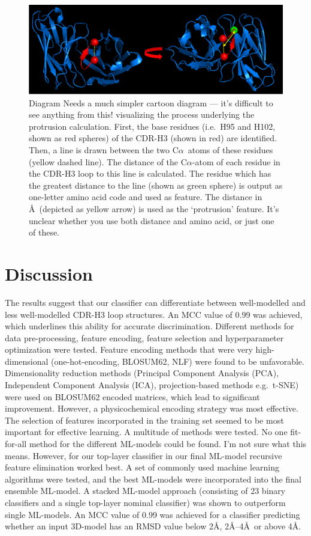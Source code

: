 \documentclass[12pt]{article}
\newcommand{\ca}{\mbox{C$\alpha$}}
\newcommand{\lilian}[1]{ {\color{red}{\bfseries Lilian:} #1}}
\begin{document}
\begin{figure}
  \centering
  \includegraphics[width=\linewidth]{angle.eps}
  \caption {Diagram \lilian{Needs a much simpler cartoon diagram --- it's difficult to see anything from this!}
    visualizing the process underlying the protrusion
    calculation. First, the base residues (i.e.\ H95 and H102, shown as
    red spheres) of the CDR-H3 (shown in red) are identified. Then, a
    line is drawn between the two \ca\ atoms of these residues (yellow
    dashed line). The distance of the \ca-atom of each residue in the
    CDR-H3 loop to this line is calculated. The residue which has the
    greatest distance to the line (shown as green sphere) is output
    as one-letter amino acid code and used as feature. The distance in
    \AA\ (depicted as yellow arrow) is used as the `protrusion'
    feature. \lilian{It's unclear whether you use both distance and amino acid, or just one of these.}}
  \label{fig:angle}
\end{figure}




\section{Discussion}
The results suggest that our classifier can differentiate
between well-modelled and less well-modelled CDR-H3 loop
structures. An MCC value of 0.99 was achieved, which underlines this
ability for accurate discrimination. Different methods for data
pre-processing, feature encoding, feature selection and hyperparameter
optimization were tested.
Feature encoding methods that were very high-dimensional
(one-hot-encoding, BLOSUM62, NLF) were found to be
unfavorable. Dimensionality reduction methods (Principal Component
Analysis (PCA), Independent Component Analysis (ICA), projection-based
methods e.g.\ t-SNE) were used on BLOSUM62 encoded matrices, which lead
to significant improvement. However, a physicochemical encoding
strategy was most effective.
The selection of features incorporated in the training set seemed to
be most important for effective learning. A multitude of methods were
tested. No one fit-for-all method for the different ML-models could be
found.\lilian{I'm not sure what this means.} However, for our top-layer classifier in our final ML-model
recursive feature elimination worked best.
A set of commonly used machine learning algorithms were tested, and
the best ML-models were incorporated into the final ensemble ML-model. A
stacked ML-model approach (consisting of 23 binary classifiers and a
single top-layer nominal classifier) was shown to outperform single
ML-models.
An MCC value of 0.99 was achieved for a classifier predicting whether
an input 3D-model has an RMSD value below 2\AA, 2\AA--4\AA\ or above
4\AA.
\end{document}
